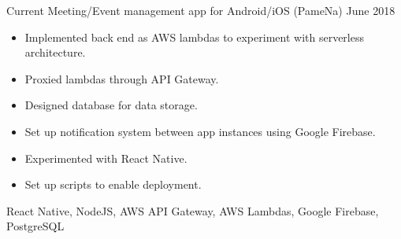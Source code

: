 %
%
%

  \begin{experiences}
    \personal
      {Current}
      {Meeting/Event management app for Android/iOS (PameNa)}
      {June 2018}
      {
        \begin{itemize}
          \item Implemented back end as AWS lambdas to experiment with serverless architecture.
          \item Proxied lambdas through API Gateway.
          \item Designed database for data storage.
          \item Set up notification system between app instances using Google Firebase.
          \item Experimented with React Native.
          \item Set up scripts to enable deployment.
        \end{itemize}
      }
      {React Native, NodeJS, AWS API Gateway, AWS Lambdas, Google Firebase, PostgreSQL}
      {}
  \end{experiences}
